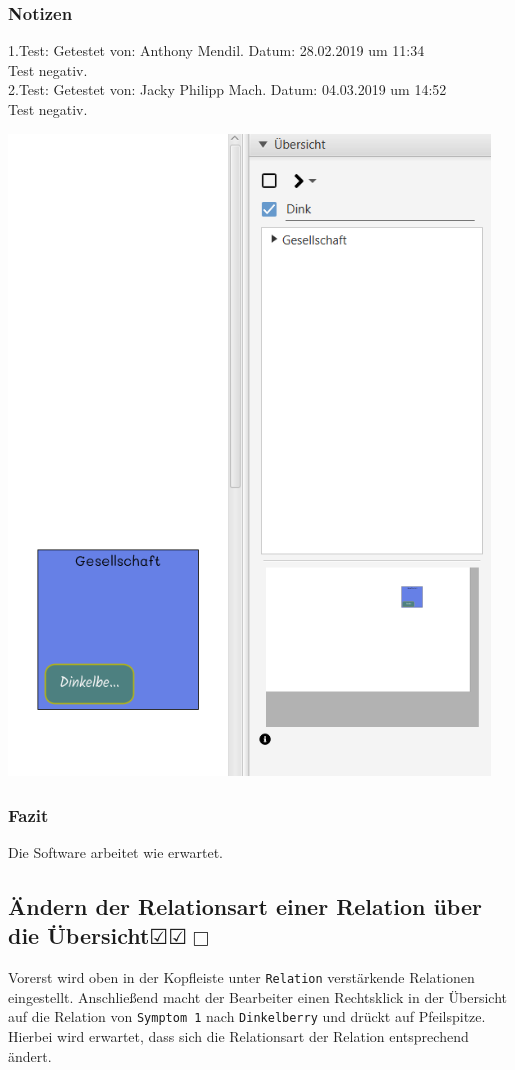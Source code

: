 \documentclass[enabledeprecatedfontcommands]{scrartcl}
\newcommand{\subsectiont}[2]{\subsection[#1]{#1{\normalsize\normalfont #2}}}
\newcommand{\leer}{$\Box$}
\newcommand{\ok}{$\CheckedBox$}
\begin{document}
\subsubsection{Notizen}
1.Test: Getestet von: Anthony Mendil. Datum: 28.02.2019 um 11:34 \\
Test negativ. \\
2.Test: Getestet von: Jacky Philipp Mach. Datum: 04.03.2019 um 14:52 \\
Test negativ.
\begin{center}
\includegraphics[height=17cm]{zoomKontext.PNG}
\end{center}
\subsubsection{Fazit}
Die Software arbeitet wie erwartet.

\subsectiont{Ändern der Relationsart einer Relation über die Übersicht}{\dotfill\ok\ok\leer}
Vorerst wird oben in der Kopfleiste unter \texttt{Relation} verstärkende Relationen eingestellt. Anschließend macht der Bearbeiter einen Rechtsklick in der Übersicht auf die Relation von \texttt{Symptom 1} nach \texttt{Dinkelberry} und drückt auf Pfeilspitze. Hierbei wird erwartet, dass sich die Relationsart der Relation entsprechend ändert.
\end{document}

